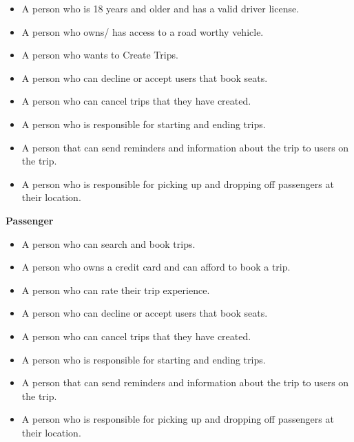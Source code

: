 \documentclass[hidelinks, 12pt, a4paper]{article}
\begin{document}
\begin{itemize}

      \item A person who is 18 years and older and has a valid driver license.
      \item A person who owns/ has access to a road worthy vehicle.
      \item A person who wants to Create Trips.
      \item A person who can decline or accept users that book seats.
      \item A person who can cancel trips that they have created.
      \item A person who is responsible for starting and ending trips.
      \item A person that can send reminders and information about the trip to users on the trip.
      \item  A person who is responsible for picking up and dropping off passengers at their location.
\end{itemize}
\vspace{0.5cm}

\large{ \textbf{Passenger} }

\begin{itemize}

      \item A person who can search and book trips.
      \item A person who owns a credit card and can afford to book a trip.
      \item A person who can rate their trip experience.
      \item A person who can decline or accept users that book seats.
      \item A person who can cancel trips that they have created.
      \item A person who is responsible for starting and ending trips.
      \item A person that can send reminders and information about the trip to users on the trip.
      \item  A person who is responsible for picking up and dropping off passengers at their location.
\end{itemize}

\newpage
\end{document}

